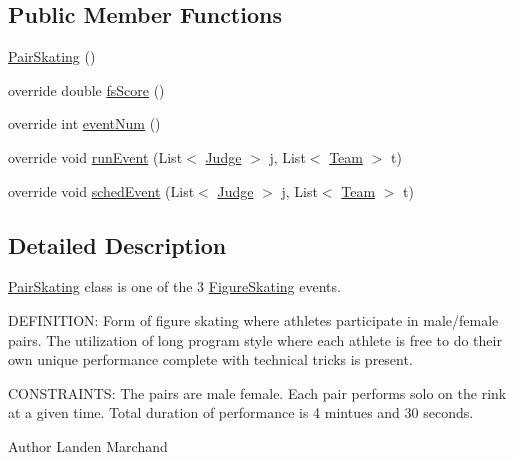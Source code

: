 \subsection*{Public Member Functions}
\begin{DoxyCompactItemize}
\item 
\hyperlink{classProject__Codename__Olympia__v1_1_1__0_1_1PairSkating_aac71e0374562ef7e4c3d9c87366517f9}{Pair\+Skating} ()
\item 
override double \hyperlink{classProject__Codename__Olympia__v1_1_1__0_1_1PairSkating_aef6f7313446386c4e6bdf8a438e246a1}{fs\+Score} ()
\item 
override int \hyperlink{classProject__Codename__Olympia__v1_1_1__0_1_1PairSkating_a22c797f9392cc5e53c9cbacb641e56e0}{event\+Num} ()
\item 
override void \hyperlink{classProject__Codename__Olympia__v1_1_1__0_1_1PairSkating_a5150348cf16352d2ce4ae63ac4e8a44d}{run\+Event} (List$<$ \hyperlink{classProject__Codename__Olympia__v1_1_1__0_1_1Judge}{Judge} $>$ j, List$<$ \hyperlink{classProject__Codename__Olympia__v1_1_1__0_1_1Team}{Team} $>$ t)
\item 
override void \hyperlink{classProject__Codename__Olympia__v1_1_1__0_1_1PairSkating_abc9c2d9765ad831e59228697a334da6d}{sched\+Event} (List$<$ \hyperlink{classProject__Codename__Olympia__v1_1_1__0_1_1Judge}{Judge} $>$ j, List$<$ \hyperlink{classProject__Codename__Olympia__v1_1_1__0_1_1Team}{Team} $>$ t)
\end{DoxyCompactItemize}


\subsection{Detailed Description}
\hyperlink{classProject__Codename__Olympia__v1_1_1__0_1_1PairSkating}{Pair\+Skating} class is one of the 3 \hyperlink{classProject__Codename__Olympia__v1_1_1__0_1_1FigureSkating}{Figure\+Skating} events. 

D\+E\+F\+I\+N\+I\+T\+I\+ON\+: Form of figure skating where athletes participate in male/female pairs. The utilization of long program style where each athlete is free to do their own unique performance complete with technical tricks is present.

C\+O\+N\+S\+T\+R\+A\+I\+N\+TS\+: The pairs are male female. Each pair performs solo on the rink at a given time. Total duration of performance is 4 mintues and 30 seconds.\begin{DoxyAuthor}{Author}
Landen Marchand 
\end{DoxyAuthor}


